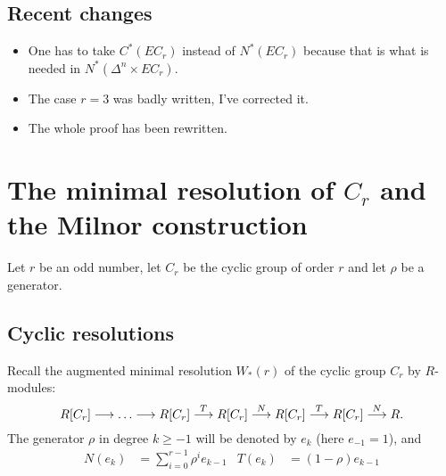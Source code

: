 \subsection*{Recent changes}
\begin{itemize}
	\item One has to take $C^*(EC_r)$ instead of $N^*(EC_r)$ because that is what is needed in $N^*(\Delta^n\times EC_r)$.
	\item The case $r=3$ was badly written, I've corrected it.
	\item The whole proof has been rewritten.
\end{itemize}

\section{The minimal resolution of $C_r$ and the Milnor construction}
Let $r$ be an odd number, let $C_r$ be the cyclic group of order $r$ and let $\rho$ be a generator.

\subsection{Cyclic resolutions}
Recall the augmented minimal resolution $W_*(r)$ of the cyclic group $C_r$ by $R$-modules:
\[R[C_r]\longrightarrow\ldots \longrightarrow R[C_r]\overset{T}{\longrightarrow} R[C_r]\overset{N}{\longrightarrow}R[C_r]\overset{T}{\longrightarrow} R[C_r] \overset{N}{\longrightarrow} R.\]
The generator $\rho$ in degree $k\geq -1$ will be denoted by $e_k$ (here $e_{-1}=1$), and
\begin{align*}
	N(e_k) &= \sum_{i=0}^{r-1} \rho^ie_{k-1} &
	T(e_k) &= (1-\rho)e_{k-1}
\end{align*}

